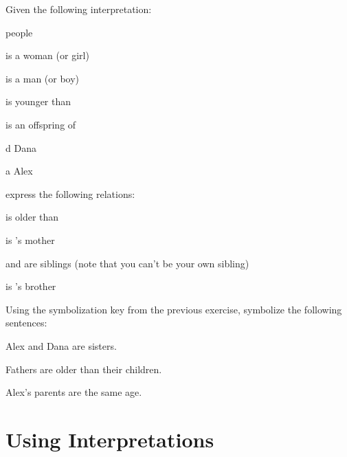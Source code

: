 \solutions
\problempart
Given the following interpretation:
\begin{ekey}
	\item[\text{论域}] people
	\item[\atom{W}{x}]  is a woman (or girl)
	\item[\atom{M}{x}]  is a man (or boy)
	\item[\atom{Y}{x,y}]  is younger than 
	\item[\atom{O}{x,y}]  is an offspring of 
	\item[d] Dana
	\item[a] Alex
\end{ekey}
express the following relations:
\begin{compactlist}
	\item {} is older than  \hfill{}
	\item {} is 's mother \hfill{}
	\item {} and  are siblings (note that you can't be your
	own sibling) \hfill{}
	\item {} is 's brother \hfill{}
\end{compactlist}

\problempart
Using the symbolization key from the previous
exercise, symbolize the following sentences:
\begin{compactlist}
	\item Alex and Dana are sisters. \hfill{}
	\item Fathers are older than their children.
	\hfill{}
	\item Alex's parents are the same age. \hfill{}
\end{compactlist}

\chapter{Using Interpretations}\setcounter{ProbPart}{0}

